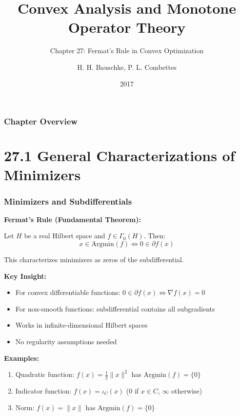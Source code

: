 \documentclass[aspectratio=169,10pt]{beamer}
\title[Chapter 27: Fermat's Rule]{Convex Analysis and Monotone Operator Theory}
\subtitle{Chapter 27: Fermat's Rule in Convex Optimization}
\author{H. H. Bauschke, P. L. Combettes}
\date{2017}
\begin{document}
\frame{\titlepage}

\begin{frame}
\frametitle{Chapter Overview}
\tableofcontents
\end{frame}

\section{27.1 General Characterizations of Minimizers}

\begin{frame}[allowframebreaks]
\frametitle{Minimizers and Subdifferentials}

\textbf{Fermat's Rule (Fundamental Theorem):}

Let $H$ be a real Hilbert space and $f \in \Gamma_0(H)$. Then:
\[x \in \text{Argmin}(f) \iff 0 \in \partial f(x)\]

This characterizes minimizers as zeros of the subdifferential.

\vspace{0.3cm}

\textbf{Key Insight:}
\begin{itemize}
    \item For convex differentiable functions: $0 \in \partial f(x) \iff \nabla f(x) = 0$
    \item For non-smooth functions: subdifferential contains all subgradients
    \item Works in infinite-dimensional Hilbert spaces
    \item No regularity assumptions needed
\end{itemize}

\vspace{0.3cm}

\textbf{Examples:}
\begin{enumerate}
    \item Quadratic function: $f(x) = \frac{1}{2}\|x\|^2$ has $\text{Argmin}(f) = \{0\}$
    \item Indicator function: $f(x) = \iota_C(x)$ (0 if $x \in C$, $\infty$ otherwise)
    \item Norm: $f(x) = \|x\|$ has $\text{Argmin}(f) = \{0\}$
\end{enumerate}

\end{frame}
\end{document}
